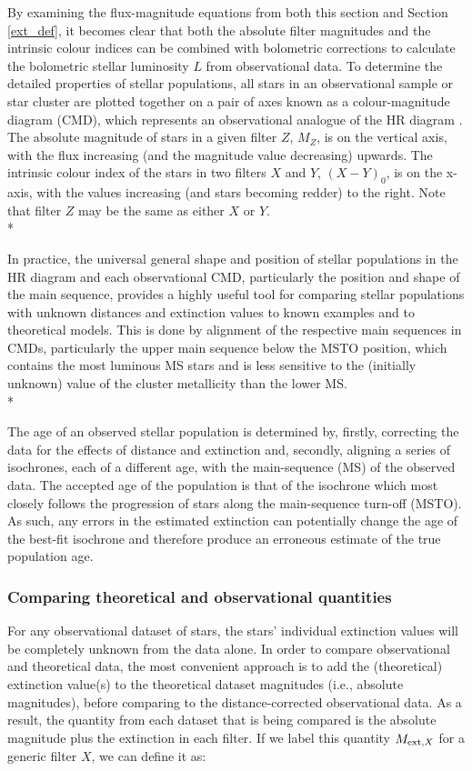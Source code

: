 \documentclass[12pt, a4paper]{report}
\begin{document}
By examining the flux-magnitude equations from both this section and Section \ref{ext_def}, it becomes clear that both the absolute filter magnitudes and the intrinsic colour indices can be combined with bolometric corrections to calculate the bolometric stellar luminosity $L$ from observational data. To determine the detailed properties of stellar populations, all stars in an observational sample or star cluster are plotted together on a pair of axes known as a colour-magnitude diagram (CMD), which represents an observational analogue of the HR diagram \citep{2005ARA&A..43..293B}. The absolute magnitude of stars in a given filter $Z$, $M_{Z}$, is on the vertical axis, with the flux increasing (and the magnitude value decreasing) upwards. The intrinsic colour index of the stars in two filters $X$ and $Y$, $(X-Y)_{0}$, is on the x-axis, with the values increasing (and stars becoming redder) to the right. Note that filter $Z$ may be the same as either $X$ or $Y$.\\*

In practice, the universal general shape and position of stellar populations in the HR diagram and each observational CMD, particularly the position and shape of the main sequence, provides a highly useful tool for comparing stellar populations with unknown distances and extinction values to known examples and to theoretical models. This is done by alignment of the respective main sequences in CMDs, particularly the upper main sequence below the MSTO position, which contains the most luminous MS stars and is less sensitive to the (initially unknown) value of the cluster metallicity than the lower MS. \\*

The age of an observed stellar population is determined by, firstly, correcting the data for the effects of distance and extinction and, secondly, aligning a series of isochrones, each of a different age, with the main-sequence (MS) of the observed data. The accepted age of the population is that of the isochrone which most closely follows the progression of stars along the main-sequence turn-off (MSTO). As such, any errors in the estimated extinction can potentially change the age of the best-fit isochrone and therefore produce an erroneous estimate of the true population age.

\subsubsection{Comparing theoretical and observational quantities} \label{add_ext}
For any observational dataset of stars, the stars' individual extinction values will be completely unknown from the data alone. In order to compare observational and theoretical data, the most convenient approach is to add the (theoretical) extinction value(s) to the theoretical dataset magnitudes (i.e., absolute magnitudes), before comparing to the distance-corrected observational data. As a result, the quantity from each dataset that is being compared is the absolute magnitude plus the extinction in each filter. If we label this quantity $M_{\textnormal{ext},X}$ for a generic filter $X$, we can define it as:
\end{document}
